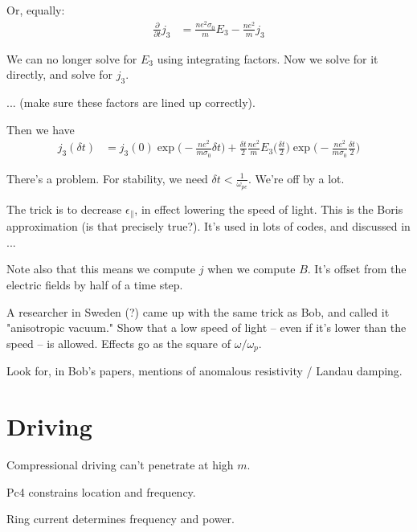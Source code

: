 Or, equally: 
\begin{align}
  \frac{\partial}{\partial t} j_3 & = 
  \frac{n e^2 \sigma_0}{m} E_3 - 
  \frac{n e^2}{m} j_3
\end{align}

We can no longer solve for $E_3$ using integrating factors. Now we solve for it directly, and solve for $j_3$. 

... (make sure these factors are lined up correctly). 

Then we have 
\begin{align}
  j_3(\delta t) & = 
  j_3(0) \exp \big( -\frac{n e^2}{m \sigma_0} \delta t \big) +  
  \frac{\delta t}{2} \frac{n e^2}{m} E_3 
    \big( \frac{\delta t}{2} \big) \exp \big( -\frac{n e^2}{m \sigma_0} \frac{\delta t}{2} \big)
\end{align}

There's a problem. For stability, we need $\delta t < \frac{1}{ \omega_{p e} }$. We're off by a lot. 

The trick is to decrease $\epsilon_\parallel$, in effect lowering the speed of light. This is the Boris approximation (is that precisely true?). It's used in lots of codes, and discussed in ...

Note also that this means we compute $j$ when we compute $B$. It's offset from the electric fields by half of a time step. 

A researcher in Sweden (?) came up with the same trick as Bob, and called it "anisotropic vacuum." Show that a low speed of light -- even if it's lower than the \Alfven speed -- is allowed. Effects go as the square of $\omega/\omega_p$. 

Look for, in Bob's papers, mentions of anomalous resistivity / Landau damping. 



\section{Driving}

Compressional driving can't penetrate at high $m$. 

Pc4 constrains location and frequency. 

Ring current determines frequency and power. 

